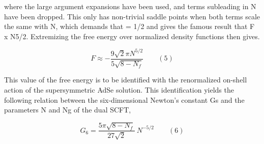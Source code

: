 \documentclass{article}
\begin{document}
where the large argument expansions have been used, and terms subleading in N have been
dropped. This only has non-trivial saddle points when both terms scale the same with N,
which demands that  = 1/2 and gives the famous result that F x N5/2. Extremizing the
free energy over normalized density functions then gives.


\begin{equation}
F\approx-{\frac{9\sqrt{2}\pi N^{5/2}}{5\sqrt{8-N_{f}}}}\qquad (5)
\end{equation}


This value of the free energy is to be identified with the renormalized on-shell action of the
supersymmetric AdSe solution. This identification yields the following relation between the
six-dimensional Newton's constant Gs and the parameters N and Ng of the dual SCFT,


\begin{equation}
G_{6}=\frac{5\pi\sqrt{8-N_{f}}}{27\sqrt{2}}\ N^{-5/2}\qquad (6)
\end{equation}
\end{document}
